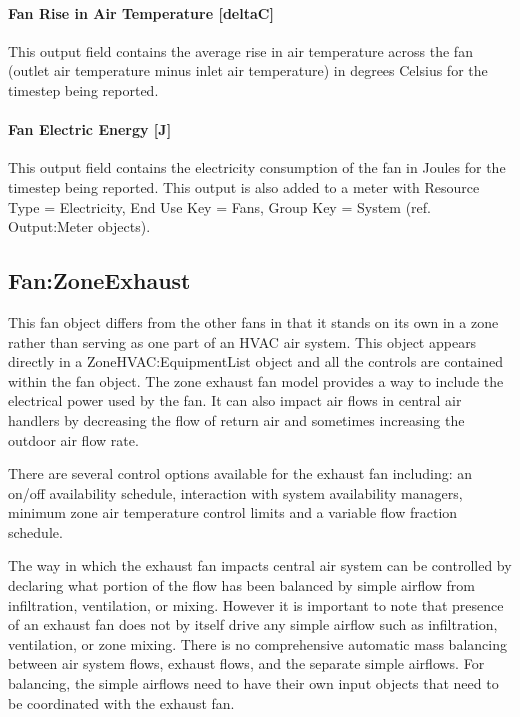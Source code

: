 \paragraph{Fan Rise in Air Temperature {[}deltaC{]}}\label{fan-rise-in-air-temperature-deltac-2}

This output field contains the average rise in air temperature across the fan (outlet air temperature minus inlet air temperature) in degrees Celsius for the timestep being reported.

\paragraph{Fan Electric Energy {[}J{]}}\label{fan-electric-energy-j-2}

This output field contains the electricity consumption of the fan in Joules for the timestep being reported. This output is also added to a meter with Resource Type = Electricity, End Use Key = Fans, Group Key = System (ref. Output:Meter objects).

\subsection{Fan:ZoneExhaust}\label{fanzoneexhaust}

This fan object differs from the other fans in that it stands on its own in a zone rather than serving as one part of an HVAC air system. This object appears directly in a ZoneHVAC:EquipmentList object and all the controls are contained within the fan object. The zone exhaust fan model provides a way to include the electrical power used by the fan. It can also impact air flows in central air handlers by decreasing the flow of return air and sometimes increasing the outdoor air flow rate.

There are several control options available for the exhaust fan including: an on/off availability schedule, interaction with system availability managers, minimum zone air temperature control limits and a variable flow fraction schedule.

The way in which the exhaust fan impacts central air system can be controlled by declaring what portion of the flow has been balanced by simple airflow from infiltration, ventilation, or mixing. However it is important to note that presence of an exhaust fan does not by itself drive any simple airflow such as infiltration, ventilation, or zone mixing. There is no comprehensive automatic mass balancing between air system flows, exhaust flows, and the separate simple airflows. For balancing, the simple airflows need to have their own input objects that need to be coordinated with the exhaust fan.

